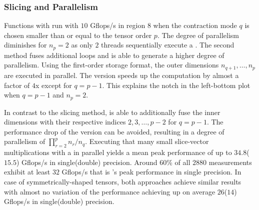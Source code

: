 \subsubsection{Slicing and Parallelism}
Functions with  run with $10$ Gflops/s in region $8$ when the contraction mode $q$ is chosen smaller than or equal to the tensor order $p$.
The degree of parallelism diminishes for $n_p=2$ as only $2$ threads sequentially execute a .
The second method  fuses additional loops and is able to generate a higher degree of parallelism.
Using the first-order storage format, the outer dimensions $n_{q+1}, \dots, n_p$ are executed in parallel.
The  version speeds up the computation by almost a factor of $4$x except for $q = p-1$.
This explains the notch in the left-bottom plot when $q = p-1$ and $n_{p} = 2$.

In contrast to the  slicing method,  is able to additionally fuse the inner dimensions with their respective indices $2,3, \dots, p-2$ for $q=p-1$.
The performance drop of the  version can be avoided, resulting in a degree of parallelism of $\prod_{r=2}^{p} n_{r} / n_q$.
Executing that many small slice-vector multiplications with a  in parallel yields a mean peak performance of up to $34.8$($15.5$) Gflops/s in single(double) precision.
Around $60$\% of all $2880$ measurements exhibit at least $32$ Gflops/s that is 's peak performance in single precision.
In case of symmetrically-shaped tensors, both approaches achieve similar results with almost no variation of the performance achieving up on average $26$($14$) Gflops/s in single(double) precision.


